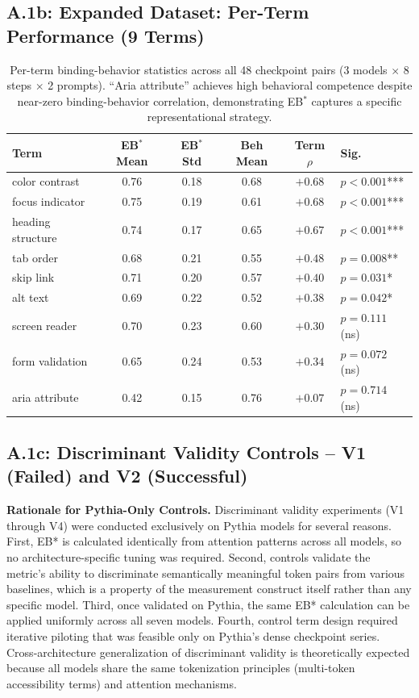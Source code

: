 \documentclass[10pt]{article} %
\begin{document}
\subsection*{A.1b: Expanded Dataset: Per-Term Performance (9 Terms)}

\begin{table}[H]
\centering
\small
\begin{tabular}{|l|c|c|c|c|l|}
\hline
\textbf{Term} & \textbf{EB$^*$ Mean} & \textbf{EB$^*$ Std} & \textbf{Beh Mean} & \textbf{Term $\rho$} & \textbf{Sig.} \\
\hline
color contrast & 0.76 & 0.18 & 0.68 & $+0.68$ & $p<0.001$*** \\
focus indicator & 0.75 & 0.19 & 0.61 & $+0.68$ & $p<0.001$*** \\
heading structure & 0.74 & 0.17 & 0.65 & $+0.67$ & $p<0.001$*** \\
tab order & 0.68 & 0.21 & 0.55 & $+0.48$ & $p=0.008$** \\
skip link & 0.71 & 0.20 & 0.57 & $+0.40$ & $p=0.031$* \\
alt text & 0.69 & 0.22 & 0.52 & $+0.38$ & $p=0.042$* \\
screen reader & 0.70 & 0.23 & 0.60 & $+0.30$ & $p=0.111$ (ns) \\
form validation & 0.65 & 0.24 & 0.53 & $+0.34$ & $p=0.072$ (ns) \\
aria attribute & 0.42 & 0.15 & 0.76 & $+0.07$ & $p=0.714$ (ns) \\
\hline
\end{tabular}
\caption{Per-term binding-behavior statistics across all 48 checkpoint pairs (3 models $\times$ 8 steps $\times$ 2 prompts). ``Aria attribute'' achieves high behavioral competence despite near-zero binding-behavior correlation, demonstrating EB$^*$ captures a specific representational strategy.}
\label{tab:a1b_nine_term}
\end{table}

\subsection*{A.1c: Discriminant Validity Controls -- V1 (Failed) and V2 (Successful)}
\label{sec:a1c_v1v2}

\noindent\textbf{Rationale for Pythia-Only Controls.} Discriminant validity experiments (V1 through V4) were conducted exclusively on Pythia models for several reasons. First, EB* is calculated identically from attention patterns across all models, so no architecture-specific tuning was required. Second, controls validate the metric's ability to discriminate semantically meaningful token pairs from various baselines, which is a property of the measurement construct itself rather than any specific model. Third, once validated on Pythia, the same EB* calculation can be applied uniformly across all seven models. Fourth, control term design required iterative piloting that was feasible only on Pythia's dense checkpoint series. Cross-architecture generalization of discriminant validity is theoretically expected because all models share the same tokenization principles (multi-token accessibility terms) and attention mechanisms.
\end{document}
